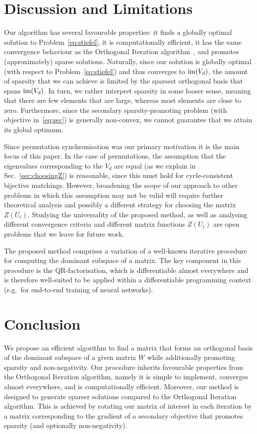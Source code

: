 \documentclass{article}
\begin{document}
\section{Discussion and Limitations}\label{sec:lim}
Our algorithm has several favourable properties: it finds a globally optimal solution to Problem~\eqref{eq:stiefel}, it is computationally efficient, it has the same convergence behaviour as the Orthogonal Iteration algorithm~\cite{golub2013matrix}, and promotes (approximately) sparse solutions. Naturally, since our solution is globally optimal (with respect to Problem~\eqref{eq:stiefel}) and thus converges to $\operatorname{im}(V_d)$, the amount of sparsity that we can achieve is limited by the sparsest orthogonal basis that spans $\operatorname{im}(V_d)$.  In turn, we rather interpret sparsity in some looser sense, meaning that there are few elements that are large, whereas most elements are close to zero. Furthermore, since the secondary sparsity-promoting problem (with objective in~\eqref{eq:sec}) is generally non-convex, we cannot guarantee that we attain its global optimum.

Since permutation synchronisation was our primary motivation it is the main focus of this paper. In the case of permutations, the assumption that the eigenvalues corresponding to the $V_d$ are equal (as we explain in Sec.~\ref{sec:choosingZ}) is reasonable, since this must hold for cycle-consistent bijective matchings. However, broadening the scope of our approach to other problems in which this assumption may not be valid will require further theoretical analysis and possibly a different strategy for choosing the matrix $Z(U_t)$. Studying the universality of the proposed method, as well as analysing different convergence criteria and different matrix functions $Z(U_t)$ are open problems that we leave for future work.

The proposed method comprises a variation of a well-known iterative procedure for computing the dominant subspace of a matrix. The key component in this procedure is the QR-factorisation, which is differentiable almost everywhere and is therefore well-suited to  be applied within a differentiable programming context (e.g.~for end-to-end training of neural networks). 

\section{Conclusion}
%
We propose an efficient algorithm to find a matrix that forms an orthogonal basis of the dominant subspace of a given matrix $W$ while additionally promoting sparsity and non-negativity.
%
%
%
Our procedure inherits favourable properties from the Orthogonal Iteration algorithm, namely it is simple to implement, converges almost everywhere, and is computationally efficient. Moreover, our method is designed to generate sparser solutions compared to the Orthogonal Iteration algorithm. This is achieved by rotating our matrix of interest in each iteration by a matrix corresponding to the gradient of a secondary objective that promotes sparsity (and optionally non-negativity).
%
\end{document}
